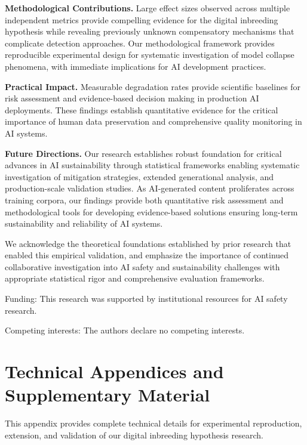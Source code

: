 \documentclass{article}
\begin{document}
\textbf{Methodological Contributions.} Large effect sizes observed across multiple independent metrics provide compelling evidence for the digital inbreeding hypothesis while revealing previously unknown compensatory mechanisms that complicate detection approaches. Our methodological framework provides reproducible experimental design for systematic investigation of model collapse phenomena, with immediate implications for AI development practices.

\textbf{Practical Impact.} Measurable degradation rates provide scientific baselines for risk assessment and evidence-based decision making in production AI deployments. These findings establish quantitative evidence for the critical importance of human data preservation and comprehensive quality monitoring in AI systems.

\textbf{Future Directions.} Our research establishes robust foundation for critical advances in AI sustainability through statistical frameworks enabling systematic investigation of mitigation strategies, extended generational analysis, and production-scale validation studies. As AI-generated content proliferates across training corpora, our findings provide both quantitative risk assessment and methodological tools for developing evidence-based solutions ensuring long-term sustainability and reliability of AI systems.

\begin{ack}
We acknowledge the theoretical foundations established by prior research that enabled this empirical validation, and emphasize the importance of continued collaborative investigation into AI safety and sustainability challenges with appropriate statistical rigor and comprehensive evaluation frameworks.

Funding: This research was supported by institutional resources for AI safety research.

Competing interests: The authors declare no competing interests.
\end{ack}




\appendix

\section*{Technical Appendices and Supplementary Material}

This appendix provides complete technical details for experimental reproduction, extension, and validation of our digital inbreeding hypothesis research.
\end{document}
